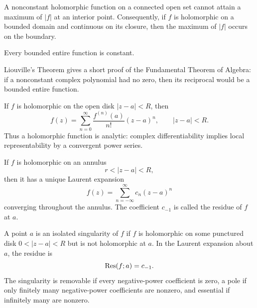     \begin{theorem}
        A nonconstant holomorphic function on a connected open set cannot attain
        a maximum of $|f|$ at an interior point. Consequently, if $f$ is
        holomorphic on a bounded domain and continuous on its closure, then the
        maximum of $|f|$ occurs on the boundary.
    \end{theorem}

    \begin{theorem}
        Every bounded entire function is constant.
    \end{theorem}

    \begin{remark}
        Liouville's Theorem gives a short proof of the Fundamental Theorem of
        Algebra: if a nonconstant complex polynomial had no zero, then its
        reciprocal would be a bounded entire function.
    \end{remark}

    \begin{theorem}
        If $f$ is holomorphic on the open disk $|z-a|<R$, then
        \[
            f(z)
            =
            \sum_{n=0}^{\infty}
            \frac{f^{(n)}(a)}{n!}(z-a)^n,
            \qquad
            |z-a|<R.
        \]
        Thus a holomorphic function is analytic: complex differentiability implies
        local representability by a convergent power series.
    \end{theorem}

    \begin{theorem}
        If $f$ is holomorphic on an annulus
        \[
            r<|z-a|<R,
        \]
        then it has a unique Laurent expansion
        \[
            f(z)
            =
            \sum_{n=-\infty}^{\infty}c_n(z-a)^n
        \]
        converging throughout the annulus. The coefficient $c_{-1}$ is called the
        residue of $f$ at $a$.
    \end{theorem}

    \begin{definition}
        A point $a$ is an isolated singularity of $f$ if $f$ is holomorphic on
        some punctured disk $0<|z-a|<R$ but is not holomorphic at $a$. In the
        Laurent expansion about $a$, the residue is
        \[
            \operatorname{Res}(f;a)=c_{-1}.
        \]
        The singularity is removable if every negative-power coefficient is zero,
        a pole if only finitely many negative-power coefficients are nonzero, and
        essential if infinitely many are nonzero.
    \end{definition}

